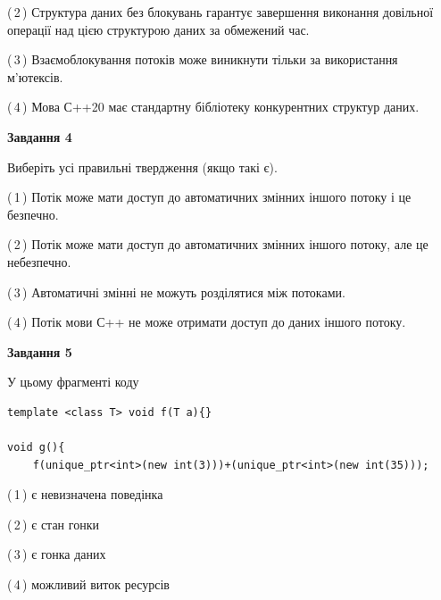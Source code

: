 \documentclass[12pt, ukrainian]{article}
\begin{document}
\begin {large}
{(\,2\,) Структура даних без блокувань гарантує завершення виконання довільної операції над цією структурою даних за обмежений час.%

(\,3\,) Взаємоблокування потоків може виникнути тільки за використання м’ютексів.%

(\,4\,) Мова С++20 має стандартну бібліотеку конкурентних структур даних.%



\begin{center}
\textbf{Завдання 4}
\end{center}
Виберіть усі правильні твердження (якщо такі є).\par
\vspace{2mm}

(\,1\,) Потік може мати доступ до автоматичних змінних іншого потоку і це безпечно.%

(\,2\,) Потік може мати доступ до автоматичних змінних іншого потоку, але це небезпечно.%

(\,3\,) Автоматичні змінні не можуть розділятися між потоками.%

(\,4\,) Потік мови С++ не може отримати доступ до даних іншого потоку.%



\begin{center}
\textbf{Завдання 5}
\end{center}
У цьому фрагменті коду
\begin{verbatim}
template <class T> void f(T a){}

void g(){
    f(unique_ptr<int>(new int(3)))+(unique_ptr<int>(new int(35)));
\end{verbatim}

(\,1\,) є невизначена поведінка%

(\,2\,) є стан гонки%

(\,3\,) є гонка даних%

(\,4\,) можливий виток ресурсів%


}
\end {large}
\end{document}
